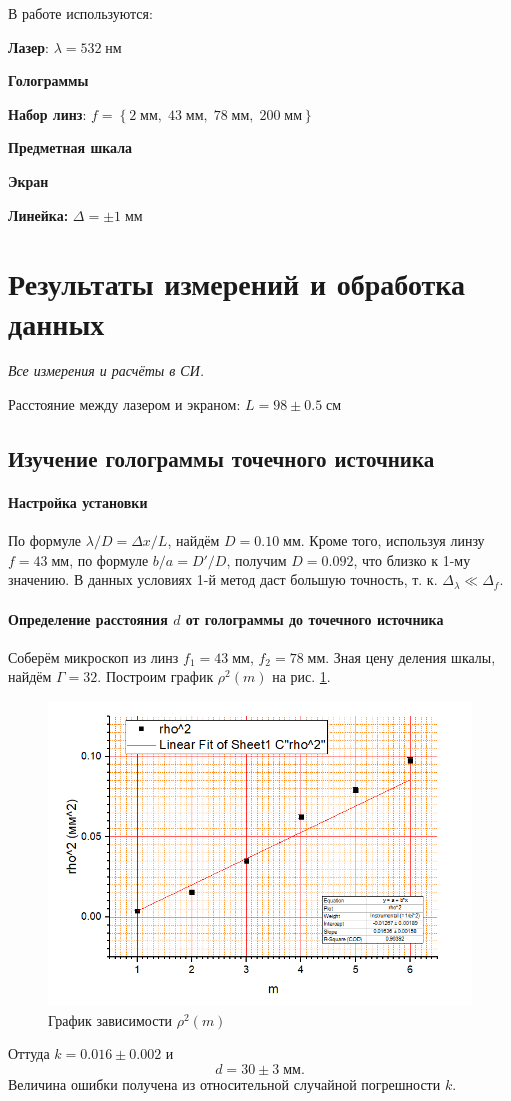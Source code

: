 \documentclass[a4paper]{article}
\newcommand{\Equip}[3]{
	
	{\bf #1:} $\Delta = \pm #2\; #3$}
\newcommand{\equip}[1]{
	
	{\bf #1}}
\begin{document}
В работе используются:
\equip{Лазер}: $ \lambda = 532 \; нм $
\equip{Голограммы}
\equip{Набор линз}: $ f = \left\{2\; мм, \; 43 \; мм, \; 78 \; мм,\; 200 \; мм\right\} $
\equip{Предметная шкала}
\equip{Экран}
\Equip{Линейка}{1}{мм}

\section{Результаты измерений и обработка данных}
\emph{Все измерения и расчёты в СИ.}

Расстояние между лазером и экраном: $ L = 98 \pm 0.5 \; см $

\subsection{Изучение голограммы точечного источника}

\paragraph{Настройка установки}

По формуле $ \lambda / D = \Delta x / L $, найдём $ D = 0.10 \; мм $. Кроме того, используя линзу $ f= 43\; мм $, по формуле $ b / a = D' / D $, получим $ D = 0.092 $, что близко к 1-му значению. В данных условиях 1-й метод даст большую точность, т. к. $ \Delta_\lambda\ll \Delta_f $.

\paragraph{Определение расстояния $ d $ от голограммы до точечного источника}

\label{источник}

Соберём микроскоп из линз $ f_1 = 43 \; мм $, $ f_2 = 78\; мм $. Зная цену деления шкалы, найдём $ \Gamma = 32 $. Построим график $ \rho^2(m) $ на рис. \ref{fig:screenshot3}.
\begin{figure}[tbp]
	\centering
	\includegraphics[width=0.8\linewidth]{Screenshot_5}
	\caption{График зависимости $\rho^2(m)$}
	\label{fig:screenshot3}
\end{figure}
Оттуда $ k =  0.016\pm 0.002 $ и $$ d = 30\pm 3 \; мм.$$
Величина ошибки получена из относительной случайной погрешности $ k $.
\end{document}
